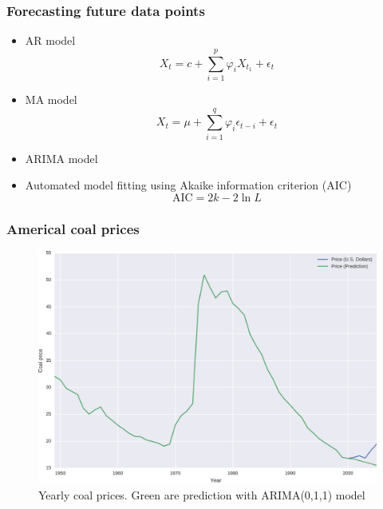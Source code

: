 \documentclass{beamer}
\begin{document}
\begin{frame}
    \frametitle{Forecasting future data points}
    \begin{itemize}
        \item AR model
        \begin{equation*}
          X_t = c + \sum_{i=1}^p{\varphi_i X_{t_1}} + \epsilon_t
        \end{equation*}

        \item MA model
        \begin{equation*}
            X_t = \mu + \sum_{i=1}^q{\varphi_i \epsilon_{t-i}} + \epsilon_t
        \end{equation*}

        \item ARIMA model
        \item Automated model fitting using Akaike information criterion (AIC)
        \begin{equation*}
            \text{AIC} = 2k - 2 \ln L
        \end{equation*}
    \end{itemize}
\end{frame}

\begin{frame}
    \frametitle{Americal coal prices}
    \begin{figure}[]
      \centering
      \includegraphics[width=0.8\linewidth]{supply}
          \caption{Yearly coal prices. Green are prediction with ARIMA(0,1,1) model}
    \end{figure}
\end{frame}
\end{document}
